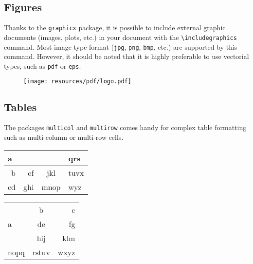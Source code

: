 \documentclass[a4paper, 12pt]{report}
\def\tbs{\textbackslash}
\begin{document}
    \subsection{Figures}

    Thanks to the \texttt{graphicx} package, it is possible to include external graphic documents (images, plots, etc.) in your document with the \texttt{\tbs{}includegraphics} command. Most image type format (\texttt{jpg}, \texttt{png}, \texttt{bmp}, etc.) are supported by this command. However, it should be noted that it is highly preferable to use vectorial types, such as \texttt{pdf} or \texttt{eps}.

    \begin{figure}[h]
        \centering
        \texttt{[image: resources/pdf/logo.pdf]}
        \label{fig:random_university_logo}
    \end{figure}

    \subsection{Tables}

    The packages \texttt{multicol} and \texttt{multirow} comes handy for complex table formatting such as multi-column or multi-row cells.

    \begin{table}[h]
        \centering
        \begin{tabular}{|r|r|c|l|}
            \hline
            \multicolumn{3}{|l|}{a} & qrs  \\ \hline
             b &  ef &     jkl      & tuvx \\ \hline
            cd & ghi &     mnop     & wyz  \\ \hline
        \end{tabular}
        \label{tab:multicol_example}
    \end{table}

    \begin{table}[h]
        \centering
        \begin{tabular}{|l|c|r|}
            \hline
            \multirow{3}{2cm}{a} &   b   &    c \\ \cline{2-3}
                                 &  de   &   fg \\ \cline{2-3}
                                 &  hij  &  klm \\ \hline
            nopq                 & rstuv & wxyz \\ \hline
        \end{tabular}
        \label{tab:multirow_example}
    \end{table}
\end{document}
